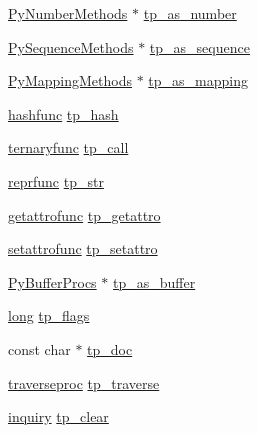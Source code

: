\begin{DoxyCompactItemize}
\item 
\mbox{\hyperlink{struct_py_number_methods}{Py\+Number\+Methods}} $\ast$ \mbox{\hyperlink{struct__typeobject_a7fe54a45ffad9dea7caa193973ccce1a}{tp\+\_\+as\+\_\+number}}
\item 
\mbox{\hyperlink{struct_py_sequence_methods}{Py\+Sequence\+Methods}} $\ast$ \mbox{\hyperlink{struct__typeobject_af75a067303be5735b139f55a197607af}{tp\+\_\+as\+\_\+sequence}}
\item 
\mbox{\hyperlink{struct_py_mapping_methods}{Py\+Mapping\+Methods}} $\ast$ \mbox{\hyperlink{struct__typeobject_a994cf6915913e523db5c29a5c78d4b24}{tp\+\_\+as\+\_\+mapping}}
\item 
\mbox{\hyperlink{_python27_2object_8h_ab4f13c4663a5e0ae8a2b829798dae462}{hashfunc}} \mbox{\hyperlink{struct__typeobject_a0264db6fd772b4c0968c4e71ca1a62a9}{tp\+\_\+hash}}
\item 
\mbox{\hyperlink{_python27_2object_8h_a3304ec7aa95ae9f0141c3b04e20f8394}{ternaryfunc}} \mbox{\hyperlink{struct__typeobject_ada85621aa05f8dcf533c3940103072bc}{tp\+\_\+call}}
\item 
\mbox{\hyperlink{_python27_2object_8h_a880e8271f8f3f984e0baecc0255c312f}{reprfunc}} \mbox{\hyperlink{struct__typeobject_a186e058ba8d2ad3dfe6f503f40a05909}{tp\+\_\+str}}
\item 
\mbox{\hyperlink{_python27_2object_8h_ae44e29e13b2c19e82e033c0a2faf9f9d}{getattrofunc}} \mbox{\hyperlink{struct__typeobject_af952b31f626d02e7e1cbe7d806ea2131}{tp\+\_\+getattro}}
\item 
\mbox{\hyperlink{_python27_2object_8h_a05938baec67b23931030056e9a8c3e1f}{setattrofunc}} \mbox{\hyperlink{struct__typeobject_a34bf7e4e5555b7569a07d538ad65910a}{tp\+\_\+setattro}}
\item 
\mbox{\hyperlink{struct_py_buffer_procs}{Py\+Buffer\+Procs}} $\ast$ \mbox{\hyperlink{struct__typeobject_a9a413fe33d7a2e14d13197f84cd26cc9}{tp\+\_\+as\+\_\+buffer}}
\item 
\mbox{\hyperlink{modsupport_8h_a0cb68e00fb9fb1260ee2daadd9fe6611}{long}} \mbox{\hyperlink{struct__typeobject_ad5e117013a7eb899c2f8e9c6d880e385}{tp\+\_\+flags}}
\item 
const char $\ast$ \mbox{\hyperlink{struct__typeobject_a1c4954276140dfcffb4150acaaff8494}{tp\+\_\+doc}}
\item 
\mbox{\hyperlink{_python27_2object_8h_a295a4db00c5ed61ab35c42c919448166}{traverseproc}} \mbox{\hyperlink{struct__typeobject_a29532c271d34df9363d7b174ab78d397}{tp\+\_\+traverse}}
\item 
\mbox{\hyperlink{_python27_2object_8h_a2614f58e24895fe4693c83466d7f46e8}{inquiry}} \mbox{\hyperlink{struct__typeobject_a092849c27b2588b5cada212c871ff009}{tp\+\_\+clear}}

\end{DoxyCompactItemize}
